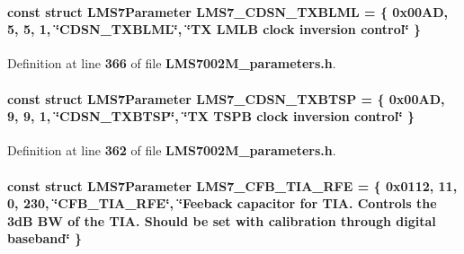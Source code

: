 \paragraph[{L\+M\+S7\+\_\+\+C\+D\+S\+N\+\_\+\+T\+X\+B\+L\+ML}]{\setlength{\rightskip}{0pt plus 5cm}const struct {\bf L\+M\+S7\+Parameter} L\+M\+S7\+\_\+\+C\+D\+S\+N\+\_\+\+T\+X\+B\+L\+ML = \{ 0x00\+A\+D, 5, 5, 1, \char`\"{}\+C\+D\+S\+N\+\_\+\+T\+X\+B\+L\+M\+L\char`\"{}, \char`\"{}\+T\+X L\+M\+L\+B clock inversion control\char`\"{} \}\hspace{0.3cm}{\ttfamily [static]}}\label{LMS7002M__parameters_8h_aa82a1d63a06a761a51b10ee4c617a60c}


Definition at line {\bf 366} of file {\bf L\+M\+S7002\+M\+\_\+parameters.\+h}.

\paragraph[{L\+M\+S7\+\_\+\+C\+D\+S\+N\+\_\+\+T\+X\+B\+T\+SP}]{\setlength{\rightskip}{0pt plus 5cm}const struct {\bf L\+M\+S7\+Parameter} L\+M\+S7\+\_\+\+C\+D\+S\+N\+\_\+\+T\+X\+B\+T\+SP = \{ 0x00\+A\+D, 9, 9, 1, \char`\"{}\+C\+D\+S\+N\+\_\+\+T\+X\+B\+T\+S\+P\char`\"{}, \char`\"{}\+T\+X T\+S\+P\+B clock inversion control\char`\"{} \}\hspace{0.3cm}{\ttfamily [static]}}\label{LMS7002M__parameters_8h_a57b05a0219e4cb93db59ed8925296b2e}


Definition at line {\bf 362} of file {\bf L\+M\+S7002\+M\+\_\+parameters.\+h}.

\paragraph[{L\+M\+S7\+\_\+\+C\+F\+B\+\_\+\+T\+I\+A\+\_\+\+R\+FE}]{\setlength{\rightskip}{0pt plus 5cm}const struct {\bf L\+M\+S7\+Parameter} L\+M\+S7\+\_\+\+C\+F\+B\+\_\+\+T\+I\+A\+\_\+\+R\+FE = \{ 0x0112, 11, 0, 230, \char`\"{}\+C\+F\+B\+\_\+\+T\+I\+A\+\_\+\+R\+F\+E\char`\"{}, \char`\"{}\+Feeback capacitor for T\+I\+A. Controls the 3d\+B B\+W of the T\+I\+A. Should be set with calibration through digital baseband\char`\"{} \}\hspace{0.3cm}{\ttfamily [static]}}\label{LMS7002M__parameters_8h_a9c34552afca0e9780c39cee89ea4bb1a}


